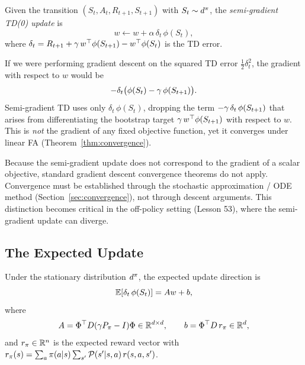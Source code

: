 \documentclass[11pt,a4paper]{article}
\begin{document}
\begin{definition}
\label{def:semi_grad_td}
Given the transition $(S_t, A_t, R_{t+1}, S_{t+1})$ with
$S_t \sim d^\pi$, the \emph{semi-gradient TD(0) update} is
\begin{equation}
  w \leftarrow w + \alpha\,\delta_t\,\phi(S_t),
  \label{eq:semi_grad_td}
\end{equation}
where $\delta_t = R_{t+1} + \gamma\, w^\top \phi(S_{t+1})
- w^\top \phi(S_t)$ is the TD error.
\end{definition}

\begin{remark}
\label{rem:semi_gradient}
If we were performing gradient descent on the squared TD error
$\frac{1}{2}\delta_t^2$, the gradient with respect to $w$ would be
\begin{equation}
  -\delta_t \bigl(\phi(S_t) - \gamma\,\phi(S_{t+1})\bigr).
  \label{eq:full_gradient}
\end{equation}
Semi-gradient TD uses only $\delta_t\,\phi(S_t)$, dropping the term
$-\gamma\,\delta_t\,\phi(S_{t+1})$ that arises from differentiating
the bootstrap target $\gamma\, w^\top \phi(S_{t+1})$ with respect
to $w$. This is \emph{not} the gradient of any fixed objective
function, yet it converges under linear FA (Theorem~\ref{thm:convergence}).
\end{remark}

\begin{warning}[title={Semi-Gradient Is Not True Gradient Descent}]
Because the semi-gradient update does not correspond to the gradient
of a scalar objective, standard gradient descent convergence theorems
do not apply. Convergence must be established through the stochastic
approximation / ODE method (Section~\ref{sec:convergence}), not through
descent arguments. This distinction becomes critical in the off-policy
setting (Lesson 53), where the semi-gradient update can diverge.
\end{warning}

\subsection{The Expected Update}
\label{subsec:expected_update}

\begin{lemma}
\label{lem:expected_update}
Under the stationary distribution $d^\pi$, the expected update
direction is
\begin{equation}
  \mathbb{E}[\delta_t\,\phi(S_t)] = Aw + b,
  \label{eq:expected_update}
\end{equation}
where
\begin{equation}
  A = \Phi^\top D(\gamma P_\pi - I)\Phi \in \mathbb{R}^{d \times d},
  \qquad
  b = \Phi^\top D\, r_\pi \in \mathbb{R}^d,
  \label{eq:A_and_b}
\end{equation}
and $r_\pi \in \mathbb{R}^n$ is the expected reward vector with
$r_\pi(s) = \sum_a \pi(a|s) \sum_{s'} \mathcal{P}(s'|s,a)\,r(s,a,s')$.
\end{lemma}
\end{document}
